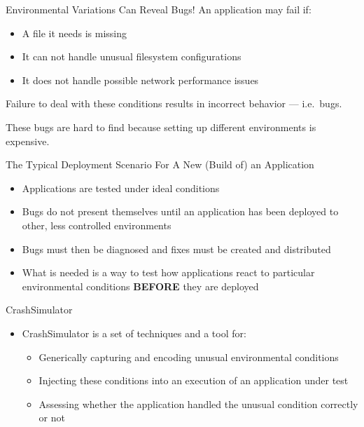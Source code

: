 \documentclass[pdf]{beamer}
\begin{document}
\begin{frame}{Environmental Variations Can Reveal Bugs!}
  An application may fail if:
  \begin{itemize}
  \item{A file it needs is missing}
  \item{It can not handle unusual filesystem configurations}
  \item{It does not handle possible network performance issues}

      \end{itemize}
      Failure to deal with these conditions results in incorrect behavior --- i.e.\ bugs.

      These bugs are hard to find because setting up different environments is
      expensive.
\end{frame}


\begin{frame}{The Typical Deployment Scenario For A New (Build of) an Application}
  \begin{itemize}
  \item{Applications are tested under ideal conditions}
  \item{Bugs do not present themselves until an application has
      been deployed to other, less controlled environments}
  \item{Bugs must then be diagnosed and fixes must be created and distributed}
  \item{What is needed is a way to test how applications react to particular
      environmental conditions \textbf{BEFORE} they are deployed}
  \end{itemize}
\end{frame}


\begin{frame}{CrashSimulator}
  \begin{itemize}
  \item{CrashSimulator is a set of techniques and a tool for:}
    \begin{itemize}
    \item{Generically capturing and encoding unusual environmental conditions}
    \item{Injecting these conditions into an execution of an application under
        test}
    \item{Assessing whether the application handled the unusual condition correctly or not}
    \end{itemize}
  \end{itemize}
\end{frame}
\end{document}
